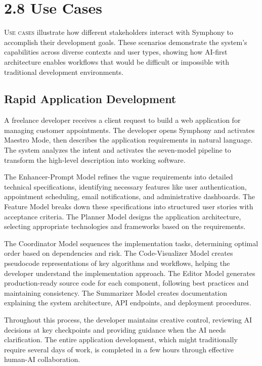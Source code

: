 
\section{2.8 Use Cases}
\label{sec:use-cases}

\lettrine{U}{se cases} illustrate how different stakeholders interact with Symphony to accomplish their development goals. These scenarios demonstrate the system's capabilities across diverse contexts and user types, showing how AI-first architecture enables workflows that would be difficult or impossible with traditional development environments.

\subsection{Rapid Application Development}
\label{subsec:rapid-application-development}

A freelance developer receives a client request to build a web application for managing customer appointments. The developer opens Symphony and activates Maestro Mode, then describes the application requirements in natural language. The system analyzes the intent and activates the seven-model pipeline to transform the high-level description into working software.

The Enhancer-Prompt Model refines the vague requirements into detailed technical specifications, identifying necessary features like user authentication, appointment scheduling, email notifications, and administrative dashboards. The Feature Model breaks down these specifications into structured user stories with acceptance criteria. The Planner Model designs the application architecture, selecting appropriate technologies and frameworks based on the requirements.

The Coordinator Model sequences the implementation tasks, determining optimal order based on dependencies and risk. The Code-Visualizer Model creates pseudocode representations of key algorithms and workflows, helping the developer understand the implementation approach. The Editor Model generates production-ready source code for each component, following best practices and maintaining consistency. The Summarizer Model creates documentation explaining the system architecture, API endpoints, and deployment procedures.

Throughout this process, the developer maintains creative control, reviewing AI decisions at key checkpoints and providing guidance when the AI needs clarification. The entire application development, which might traditionally require several days of work, is completed in a few hours through effective human-AI collaboration.

